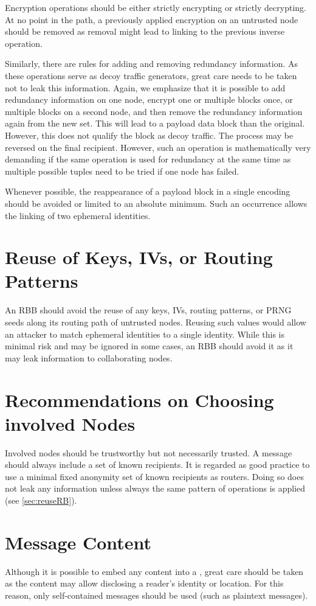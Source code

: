 Encryption operations should be either strictly encrypting or strictly decrypting. At no point in the path, a previously applied encryption on an untrusted node should be removed as removal might lead to linking to the previous inverse operation.

Similarly, there are rules for adding and removing redundancy information. As these operations serve as decoy traffic generators, great care needs to be taken not to leak this information. Again, we emphasize that it is possible to add redundancy information on one node, encrypt one or multiple blocks once, or multiple blocks on a second node, and then remove the redundancy information again from the new set. This will lead to a payload data block than the original. However, this does not qualify the block as decoy traffic. The process may be reversed on the final recipient. However, such an operation is mathematically very demanding if the same operation is used for redundancy at the same time as multiple possible tuples need to be tried if one node has failed.

Whenever possible, the reappearance of a payload block in a single encoding should be avoided or limited to an absolute minimum. Such an occurrence allows the linking of two ephemeral identities.

\section{Reuse of Keys, IVs, or Routing Patterns}
An RBB should avoid the reuse of any keys, IVs, routing patterns, or PRNG seeds along its routing path of untrusted nodes. Reusing such values would allow an attacker to match ephemeral identities to a single identity. While this is minimal risk and may be ignored in some cases, an RBB should avoid it as it may leak information to collaborating nodes.

\section{Recommendations on Choosing involved Nodes}
Involved nodes should be trustworthy but not necessarily trusted. A message should always include a set of known recipients. It is regarded as good practice to use a minimal fixed anonymity set of known recipients as routers. Doing so does not leak any information unless always the same pattern of operations is applied (see \cref{sec:reuseRB}).

\section{Message Content}
Although it is possible to embed any content into a \VortexMessage, great care should be taken as the content may allow disclosing a reader's identity or location. For this reason, only self-contained messages should be used (such as plaintext messages).

